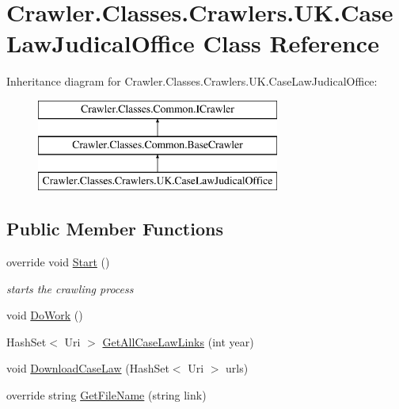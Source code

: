 \hypertarget{class_crawler_1_1_classes_1_1_crawlers_1_1_u_k_1_1_case_law_judical_office}{\section{Crawler.\-Classes.\-Crawlers.\-U\-K.\-Case\-Law\-Judical\-Office Class Reference}
\label{class_crawler_1_1_classes_1_1_crawlers_1_1_u_k_1_1_case_law_judical_office}
}
Inheritance diagram for Crawler.\-Classes.\-Crawlers.\-U\-K.\-Case\-Law\-Judical\-Office\-:\begin{figure}[H]
\begin{center}
\leavevmode
\includegraphics[height=3.000000cm]{class_crawler_1_1_classes_1_1_crawlers_1_1_u_k_1_1_case_law_judical_office}
\end{center}
\end{figure}
\subsection*{Public Member Functions}
\begin{DoxyCompactItemize}
\item 
override void \hyperlink{class_crawler_1_1_classes_1_1_crawlers_1_1_u_k_1_1_case_law_judical_office_adac917a75514264a01911cbf5476807a}{Start} ()
\begin{DoxyCompactList}\small\item\em starts the crawling process \end{DoxyCompactList}\item 
void \hyperlink{class_crawler_1_1_classes_1_1_crawlers_1_1_u_k_1_1_case_law_judical_office_a39589edc3de1f9b6a3e8e50724a66df7}{Do\-Work} ()
\item 
Hash\-Set$<$ Uri $>$ \hyperlink{class_crawler_1_1_classes_1_1_crawlers_1_1_u_k_1_1_case_law_judical_office_a3cd267d61d19fcc637059236e0981a49}{Get\-All\-Case\-Law\-Links} (int year)
\item 
void \hyperlink{class_crawler_1_1_classes_1_1_crawlers_1_1_u_k_1_1_case_law_judical_office_aab1c672e6f6485ad099076e4eeea13bf}{Download\-Case\-Law} (Hash\-Set$<$ Uri $>$ urls)
\item 
override string \hyperlink{class_crawler_1_1_classes_1_1_crawlers_1_1_u_k_1_1_case_law_judical_office_a35829eda8f98efb8fa64c3ec61e5e20a}{Get\-File\-Name} (string link)
\end{DoxyCompactItemize}
